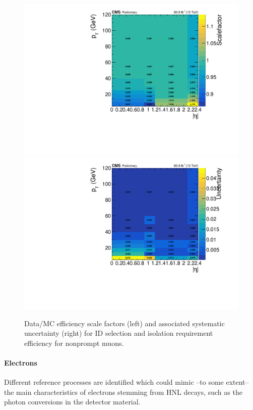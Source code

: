 \begin{figure}[h]
  \centering
 \includegraphics[width=.45\textwidth]{Figures/c6/efficiencies/muons/2018/idiso_nonprompt_sf_2018.pdf}
  \includegraphics[width=.45\textwidth]{Figures/c6/efficiencies/muons/2018/idiso_nonprompt_syst_2018.pdf}
  \caption{Data/MC efficiency scale factors (left) and associated
  systematic uncertainty (right) for ID selection and isolation
  requirement efficiency for nonprompt muons. \kirill}
  \label{fig:idiso_muon_nonprompt}
\end{figure}

\paragraph{Electrons}\label{sec:eff_disp_ele}

Different reference processes are identified which could mimic --to
some extent-- the main characteristics of \displ electrons 
stemming from HNL decays, such as the photon conversions in the
detector material.




